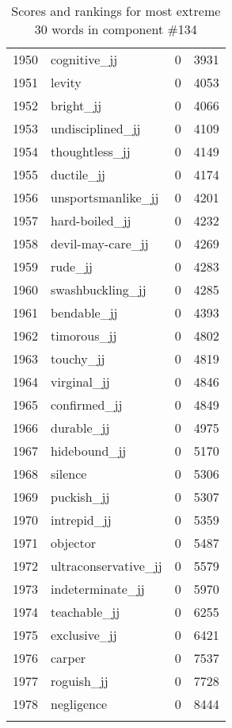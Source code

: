 \begin{longtable}[!htbp]{| rlr@{.}l |}
    1950 & cognitive\_jj & 0 & 3931 \\
    1951 & levity & 0 & 4053 \\
    1952 & bright\_jj & 0 & 4066 \\
    1953 & undisciplined\_jj & 0 & 4109 \\
    1954 & thoughtless\_jj & 0 & 4149 \\
    1955 & ductile\_jj & 0 & 4174 \\
    1956 & unsportsmanlike\_jj & 0 & 4201 \\
    1957 & hard-boiled\_jj & 0 & 4232 \\
    1958 & devil-may-care\_jj & 0 & 4269 \\
    1959 & rude\_jj & 0 & 4283 \\
    1960 & swashbuckling\_jj & 0 & 4285 \\
    1961 & bendable\_jj & 0 & 4393 \\
    1962 & timorous\_jj & 0 & 4802 \\
    1963 & touchy\_jj & 0 & 4819 \\
    1964 & virginal\_jj & 0 & 4846 \\
    1965 & confirmed\_jj & 0 & 4849 \\
    1966 & durable\_jj & 0 & 4975 \\
    1967 & hidebound\_jj & 0 & 5170 \\
    1968 & silence & 0 & 5306 \\
    1969 & puckish\_jj & 0 & 5307 \\
    1970 & intrepid\_jj & 0 & 5359 \\
    1971 & objector & 0 & 5487 \\
    1972 & ultraconservative\_jj & 0 & 5579 \\
    1973 & indeterminate\_jj & 0 & 5970 \\
    1974 & teachable\_jj & 0 & 6255 \\
    1975 & exclusive\_jj & 0 & 6421 \\
    1976 & carper & 0 & 7537 \\
    1977 & roguish\_jj & 0 & 7728 \\
    1978 & negligence & 0 & 8444 \\
    \hline
    \caption{Scores and rankings for most extreme 30 words in component \#134} \\
\end{longtable}
